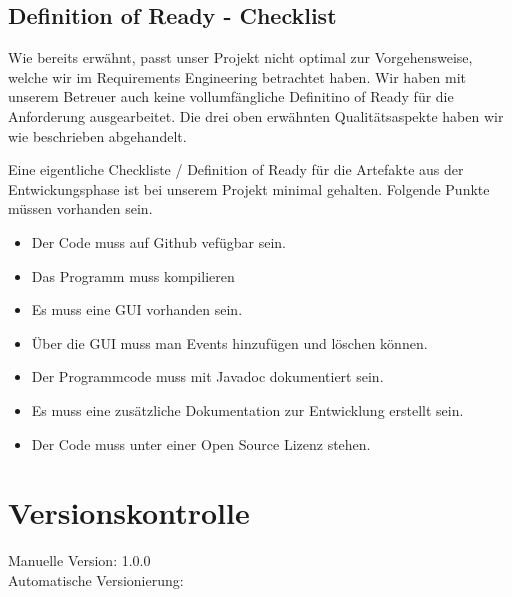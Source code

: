 \documentclass[11pt,titelpage]{scrartcl}
\begin{document}
\subsection{Definition of Ready - Checklist}
Wie bereits erwähnt, passt unser Projekt nicht optimal zur Vorgehensweise, welche wir im Requirements Engineering betrachtet haben. Wir haben mit unserem Betreuer auch keine vollumfängliche Definitino of Ready für die Anforderung ausgearbeitet. Die drei oben erwähnten Qualitätsaspekte haben wir wie beschrieben abgehandelt.


Eine eigentliche Checkliste / Definition of Ready für die Artefakte aus der Entwickungsphase ist bei unserem Projekt minimal gehalten.
Folgende Punkte müssen vorhanden sein.
\begin{itemize}
\item Der Code muss auf Github vefügbar sein.
 \item Das Programm muss kompilieren
 \item Es muss eine GUI vorhanden sein.
 \item Über die GUI muss man Events hinzufügen und löschen können.
 \item Der Programmcode muss mit Javadoc dokumentiert sein.
 \item Es muss eine zusätzliche Dokumentation zur Entwicklung erstellt sein.
 \item Der Code muss unter einer Open Source Lizenz stehen.
\end{itemize}


\section{Versionskontrolle}
Manuelle Version: 1.0.0
\\

\noindent
Automatische Versionierung:
\immediate{}

\immediate{}
\end{document}
